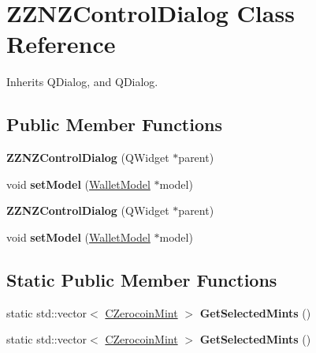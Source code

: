 \hypertarget{class_z_z_n_z_control_dialog}{}\section{Z\+Z\+N\+Z\+Control\+Dialog Class Reference}
\label{class_z_z_n_z_control_dialog}


Inherits Q\+Dialog, and Q\+Dialog.

\subsection*{Public Member Functions}
\begin{DoxyCompactItemize}
\item 
\mbox{\label{class_z_z_n_z_control_dialog_a76372f52c8587b96b4e97b46b66c91b6}} 
{\bfseries Z\+Z\+N\+Z\+Control\+Dialog} (Q\+Widget $\ast$parent)
\item 
\mbox{\label{class_z_z_n_z_control_dialog_a62e59f9b672dbbbb31a29bf62bfe9fb1}} 
void {\bfseries set\+Model} (\mbox{\hyperlink{class_wallet_model}{Wallet\+Model}} $\ast$model)
\item 
\mbox{\label{class_z_z_n_z_control_dialog_a76372f52c8587b96b4e97b46b66c91b6}} 
{\bfseries Z\+Z\+N\+Z\+Control\+Dialog} (Q\+Widget $\ast$parent)
\item 
\mbox{\label{class_z_z_n_z_control_dialog_a62e59f9b672dbbbb31a29bf62bfe9fb1}} 
void {\bfseries set\+Model} (\mbox{\hyperlink{class_wallet_model}{Wallet\+Model}} $\ast$model)
\end{DoxyCompactItemize}
\subsection*{Static Public Member Functions}
\begin{DoxyCompactItemize}
\item 
\mbox{\label{class_z_z_n_z_control_dialog_a4cab6bc760fd7128bde12aeae7f891a3}} 
static std\+::vector$<$ \mbox{\hyperlink{class_c_zerocoin_mint}{C\+Zerocoin\+Mint}} $>$ {\bfseries Get\+Selected\+Mints} ()
\item 
\mbox{\label{class_z_z_n_z_control_dialog_af84ee7149f04321f3c9ceb4d662d4900}} 
static std\+::vector$<$ \mbox{\hyperlink{class_c_zerocoin_mint}{C\+Zerocoin\+Mint}} $>$ {\bfseries Get\+Selected\+Mints} ()
\end{DoxyCompactItemize}
